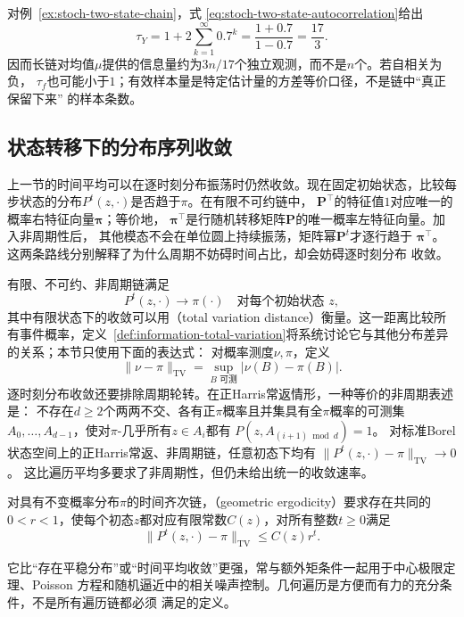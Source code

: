 对例~\ref{ex:stoch-two-state-chain}，式
\eqref{eq:stoch-two-state-autocorrelation}给出
\[
  \tau_Y=1+2\sum_{k=1}^{\infty}0.7^k
  =\frac{1+0.7}{1-0.7}=\frac{17}{3}.
\]
因而长链对均值$\mu$提供的信息量约为$3n/17$个独立观测，而不是$n$个。若自相关为负，
$\tau_f$也可能小于$1$；有效样本量是特定估计量的方差等价口径，不是链中“真正保留下来”
的样本条数。

\subsection{状态转移下的分布序列收敛}
\label{sec:rv-state-distribution-limits}
上一节的时间平均可以在逐时刻分布振荡时仍然收敛。现在固定初始状态，比较每步状态的分布\(P^t(z,\cdot)\)是否趋于\(\pi\)。在有限不可约链中，
$\bm{P}^{\top}$的特征值$1$对应唯一的概率右特征向量$\bm{\pi}$；等价地，
$\bm{\pi}^{\top}$是行随机转移矩阵$\bm{P}$的唯一概率左特征向量。加入非周期性后，
其他模态不会在单位圆上持续振荡，矩阵幂$\bm{P}^t$才逐行趋于
$\bm{\pi}^{\top}$。这两条路线分别解释了为什么周期不妨碍时间占比，却会妨碍逐时刻分布
收敛。

有限、不可约、非周期链满足
\begin{equation}
  P^t(z,\cdot)\longrightarrow\pi(\cdot)
  \quad\text{对每个初始状态 }z,
  \label{eq:stoch-finite-chain-distribution-convergence}
\end{equation}
其中有限状态下的收敛可以用（total variation distance）衡量。这一距离比较所有事件概率，定义~\ref{def:information-total-variation}将系统讨论它与其他分布差异的关系；本节只使用下面的表达式：
对概率测度$\nu,\pi$，定义
\[
  \lVert\nu-\pi\rVert_{\mathrm{TV}}
  =
  \sup_{B\text{ 可测}}|\nu(B)-\pi(B)|.
\]
逐时刻分布收敛还要排除周期轮转。在正Harris常返情形，一种等价的非周期表述是：
不存在\(d\geq2\)个两两不交、各有正\(\pi\)概率且并集具有全\(\pi\)概率的可测集
\(A_0,\ldots,A_{d-1}\)，使对\(\pi\)-几乎所有\(z\in A_i\)都有
\(P(z,A_{(i+1)\bmod d})=1\)。
对标准Borel状态空间上的正Harris常返、非周期链，任意初态下均有
\(\|P^t(z,\cdot)-\pi\|_{\mathrm{TV}}\to0\)。
这比遍历平均多要求了非周期性，但仍未给出统一的收敛速率。

\begin{definition}[几何遍历性]
  \label{def:stoch-geometric-ergodicity}
  对具有不变概率分布\(\pi\)的时间齐次链，（geometric ergodicity）要求存在共同的$0<r<1$，使每个初态\(z\)都对应有限常数$C(z)$，对所有整数\(t\geq0\)满足
\[
  \lVert P^t(z,\cdot)-\pi\rVert_{\mathrm{TV}}
  \leq C(z)r^t.
\]
\end{definition}
它比“存在平稳分布”或“时间平均收敛”更强，常与额外矩条件一起用于中心极限定理、Poisson
方程和随机逼近中的相关噪声控制。几何遍历是方便而有力的充分条件，不是所有遍历链都必须
满足的定义。

